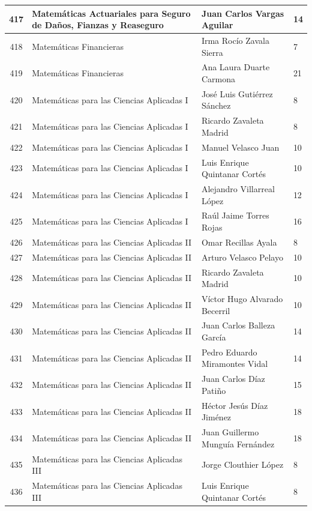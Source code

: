 {\begin{longtable}{|c|p{6.5cm}|p{5cm}|p{1.5cm}|}
  417 & Matemáticas Actuariales para Seguro de Daños, Fianzas y Reaseguro & Juan Carlos Vargas Aguilar & 14 \\ \hline
  418 & Matemáticas Financieras & Irma Rocío Zavala Sierra & 7 \\ \hline
  419 & Matemáticas Financieras & Ana Laura Duarte Carmona & 21 \\ \hline
  420 & Matemáticas para las Ciencias Aplicadas I & José Luis Gutiérrez Sánchez & 8 \\ \hline
  421 & Matemáticas para las Ciencias Aplicadas I & Ricardo Zavaleta Madrid & 8 \\ \hline
  422 & Matemáticas para las Ciencias Aplicadas I & Manuel Velasco Juan & 10 \\ \hline
  423 & Matemáticas para las Ciencias Aplicadas I & Luis Enrique Quintanar Cortés & 10 \\ \hline
  424 & Matemáticas para las Ciencias Aplicadas I & Alejandro Villarreal López & 12 \\ \hline
  425 & Matemáticas para las Ciencias Aplicadas I & Raúl Jaime Torres Rojas & 16 \\ \hline
  426 & Matemáticas para las Ciencias Aplicadas II & Omar Recillas Ayala & 8 \\ \hline
  427 & Matemáticas para las Ciencias Aplicadas II & Arturo Velasco Pelayo & 10 \\ \hline
  428 & Matemáticas para las Ciencias Aplicadas II & Ricardo Zavaleta Madrid & 10 \\ \hline
  429 & Matemáticas para las Ciencias Aplicadas II & Víctor Hugo Alvarado Becerril & 10 \\ \hline
  430 & Matemáticas para las Ciencias Aplicadas II & Juan Carlos Balleza García & 14 \\ \hline
  431 & Matemáticas para las Ciencias Aplicadas II & Pedro Eduardo Miramontes Vidal & 14 \\ \hline
  432 & Matemáticas para las Ciencias Aplicadas II & Juan Carlos Díaz Patiño & 15 \\ \hline
  433 & Matemáticas para las Ciencias Aplicadas II & Héctor Jesús Díaz Jiménez & 18 \\ \hline
  434 & Matemáticas para las Ciencias Aplicadas II & Juan Guillermo Munguía Fernández & 18 \\ \hline
  435 & Matemáticas para las Ciencias Aplicadas III & Jorge Clouthier López & 8 \\ \hline
  436 & Matemáticas para las Ciencias Aplicadas III & Luis Enrique Quintanar Cortés & 8 \\ \hline

\end{longtable}}
